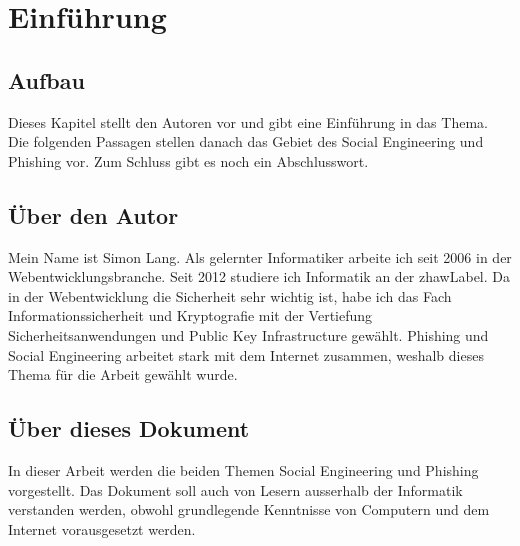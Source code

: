 \chapter{Einführung}
\label{sec:einfuehrung}

\section{Aufbau}
Dieses Kapitel stellt den Autoren vor und gibt eine Einführung in das Thema.
Die folgenden Passagen stellen danach das Gebiet des Social Engineering und Phishing vor.
Zum Schluss gibt es noch ein Abschlusswort.

\section{Über den Autor}
\label{sec:einfuehrung:autor}
Mein Name ist Simon Lang. Als gelernter Informatiker arbeite ich seit 2006 in der Webentwicklungsbranche.
Seit 2012 studiere ich Informatik an der \Gls{zhawLabel}.
Da in der Webentwicklung die Sicherheit sehr wichtig ist, habe ich das Fach Informationssicherheit und Kryptografie mit der Vertiefung Sicherheitsanwendungen und Public Key Infrastructure gewählt. 
Phishing und Social Engineering arbeitet stark mit dem Internet zusammen, weshalb dieses Thema für die Arbeit gewählt wurde.

\section{Über dieses Dokument}
In dieser Arbeit werden die beiden Themen Social Engineering und Phishing vorgestellt. 
Das Dokument soll auch von Lesern ausserhalb der Informatik verstanden werden, obwohl grundlegende Kenntnisse von Computern und dem Internet vorausgesetzt werden.

